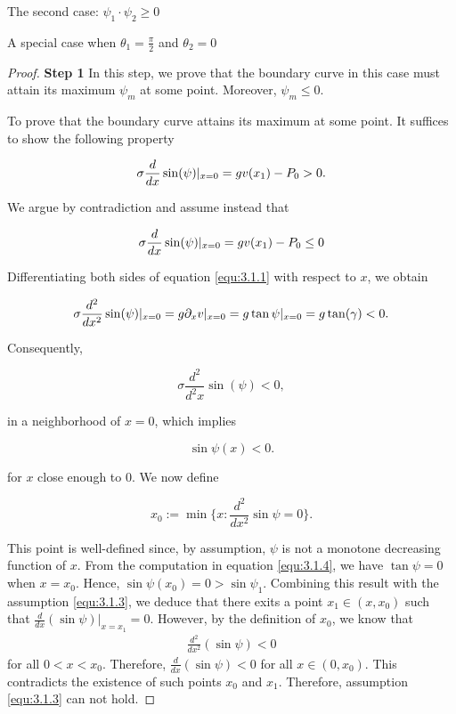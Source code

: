 \documentclass[letterpaper,reqno,10pt,twoside]{amsart}
\theoremstyle{definition}
\theoremstyle{remark}
\begin{document}
\begin{section}{The second case: $\psi_1\cdot \psi_2\geq 0$ }
\begin{subsection}{A special case when $\theta_1=\frac{\pi}{2}$ and $\theta_2=0$}
\begin{proof}
    \textbf{Step 1} In this step, we prove that the boundary curve in this case must attain its maximum $\psi_{m}$ at some point. Moreover, $\psi_m\leq0$. 
    
    To prove that the boundary curve attains its maximum at some point. It suffices to show the following property

    \begin{equation}{\label{key_assume}}
        \sigma \frac{d}{dx}\sin(\psi)|_{x=0}=gv(x_1)-P_{0}>0.
    \end{equation}

    \noindent We argue by contradiction and assume instead that

    \begin{equation}{\label{equ:3.1.3}}
        \sigma \frac{d}{dx}\sin(\psi)|_{x=0}=gv(x_1)-P_{0}\leq 0
    \end{equation}

     Differentiating both sides of equation \eqref{equ:3.1.1} with respect to $x$, we obtain

    \begin{equation}{\label{equ:3.1.4}}
        \sigma \frac{d^{2}}{dx^{2}}\sin(\psi)|_{x=0}=g\partial_{x}v|_{x=0}=g \tan\psi|_{x=0}=g \tan (\gamma)< 0.
    \end{equation}

    \noindent Consequently,

    \begin{equation*}
        \sigma \frac{d^{2}}{d^{2}x}\sin(\psi)<0,
    \end{equation*}

    \noindent in a neighborhood of $x=0$, which implies

    \begin{equation*}
        \sin\psi(x)<0.
    \end{equation*}
    
    \noindent for $x$ close enough to $0$. We now define

    \begin{equation*}
        x_{0}:=\min\{x:\frac{d^{2}}{dx^{2}}\sin\psi=0\}.
    \end{equation*}

    \noindent This point is well-defined since, by assumption, $\psi$ is not a monotone decreasing function of $x$. From the computation in equation \eqref{equ:3.1.4}, we have $\tan\psi=0$ when $x=x_0$. Hence, $\sin\psi(x_0)=0>\sin\psi_1$. Combining this result with the assumption \eqref{equ:3.1.3}, we deduce that there exits a point $x_{1}\in(x,x_{0})$ such that $\frac{d}{dx}(\sin\psi)|_{x=x_{1}}=0$. However, by the definition of $x_{0}$, we know that 
    \begin{align}
        \frac{d^{2}}{dx^{2}}(\sin\psi)<0
    \end{align}
    for all $0<x<x_0$. Therefore, $\frac{d}{dx}(\sin\psi)<0$ for all $x\in(0,x_0)$. This  contradicts the existence of such points $x_0$ and $x_{1}$. Therefore, assumption \eqref{equ:3.1.3} can not hold.
    

\end{proof}
\end{subsection}
\end{section}
\end{document}
